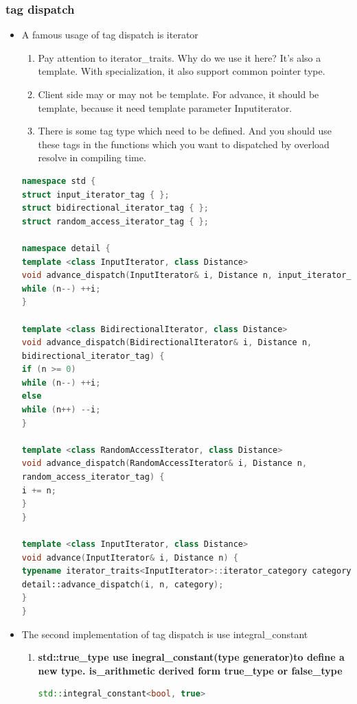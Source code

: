 \documentclass[a4paper,12pt,twoside]{book}
\begin{document}
\subsubsection{tag dispatch}
\begin{itemize}
	\item A famous usage of tag dispatch is iterator 
	\begin{enumerate}
		\item Pay attention to iterator\_traits. Why do we use it here? It's also a template. With specialization, it also support common pointer type.
		\item Client side may or may not be template. For advance, it should be template, because it need template parameter Inputiterator.
		\item There is some tag type which need to be defined. And you should use these tags in the functions which you want to dispatched by overload resolve in compiling time. 
	\end{enumerate}
\begin{lstlisting}[frame=single, language=c++]
namespace std {
struct input_iterator_tag { };
struct bidirectional_iterator_tag { };
struct random_access_iterator_tag { };

namespace detail {
template <class InputIterator, class Distance>
void advance_dispatch(InputIterator& i, Distance n, input_iterator_tag) {
while (n--) ++i;
}

template <class BidirectionalIterator, class Distance>
void advance_dispatch(BidirectionalIterator& i, Distance n, 
bidirectional_iterator_tag) {
if (n >= 0)
while (n--) ++i;
else
while (n++) --i;
}

template <class RandomAccessIterator, class Distance>
void advance_dispatch(RandomAccessIterator& i, Distance n, 
random_access_iterator_tag) {
i += n;
}
}

template <class InputIterator, class Distance>
void advance(InputIterator& i, Distance n) {
typename iterator_traits<InputIterator>::iterator_category category;
detail::advance_dispatch(i, n, category);
}
}
\end{lstlisting}

\item The second implementation of tag dispatch is use integral\_constant
\begin{enumerate}
	\item \textbf{std::true\_type use inegral\_constant(type generator)to define a new type. is\_arithmetic derived form true\_type or false\_type}
\begin{lstlisting}[frame=single, language=c++]
std::integral_constant<bool, true>


\end{lstlisting}
\end{enumerate}
\end{itemize}
\end{document}
